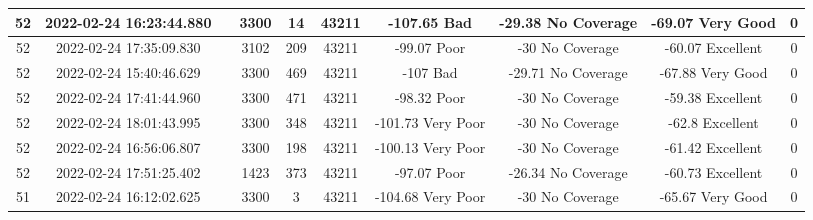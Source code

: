 \begin{longtable*}{|c|c|c|c|c|c|c|c|c|c|}
52&2022-02-24 16:23:44.880&&3300&14&43211& -107.65   Bad         & -29.38    No Coverage & -69.07    Very Good   & 0\\\hline
{}52&2022-02-24 17:35:09.830&&3102&209&43211& -99.07    Poor        & -30       No Coverage & -60.07    Excellent   & 0\\\hline
{}52&2022-02-24 15:40:46.629&&3300&469&43211& -107      Bad         & -29.71    No Coverage & -67.88    Very Good   & 0\\\hline
{}52&2022-02-24 17:41:44.960&&3300&471&43211& -98.32    Poor        & -30       No Coverage & -59.38    Excellent   & 0\\\hline
{}52&2022-02-24 18:01:43.995&&3300&348&43211& -101.73   Very Poor   & -30       No Coverage & -62.8     Excellent   & 0\\\hline
{}52&2022-02-24 16:56:06.807&&3300&198&43211& -100.13   Very Poor   & -30       No Coverage & -61.42    Excellent   & 0\\\hline
{}52&2022-02-24 17:51:25.402&&1423&373&43211& -97.07    Poor        & -26.34    No Coverage & -60.73    Excellent   & 0\\\hline
{}51&2022-02-24 16:12:02.625&&3300&3&43211& -104.68   Very Poor   & -30       No Coverage & -65.67    Very Good   & 0\\\hline

\end{longtable*}
